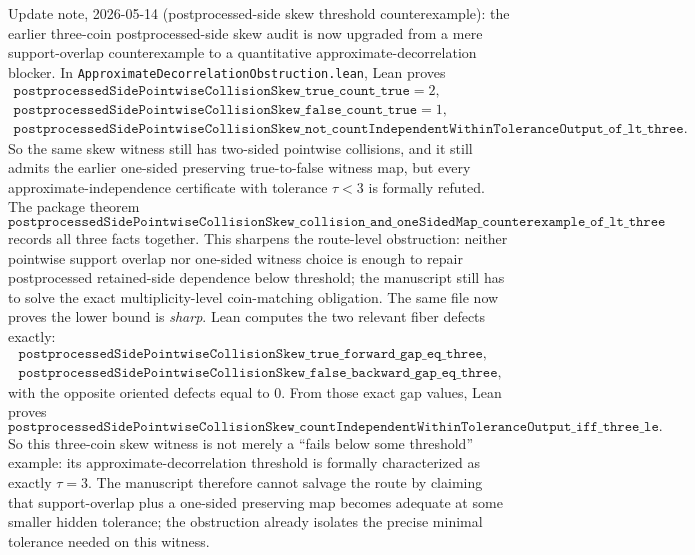 \documentclass[11pt]{article}
\theoremstyle{remark}
\begin{document}
Update note, 2026-05-14 (postprocessed-side skew threshold counterexample):
the earlier three-coin postprocessed-side skew audit is now upgraded from a
mere support-overlap counterexample to a quantitative approximate-decorrelation
blocker.  In \texttt{ApproximateDecorrelationObstruction.lean}, Lean proves
\[
\begin{gathered}
\texttt{postprocessedSidePointwiseCollisionSkew\_true\_count\_true}=2,\\
\texttt{postprocessedSidePointwiseCollisionSkew\_false\_count\_true}=1,\\
\texttt{postprocessedSidePointwiseCollisionSkew\_not\_countIndependentWithinToleranceOutput\_of\_lt\_three}.
\end{gathered}
\]
So the same skew witness still has two-sided pointwise collisions, and it still
admits the earlier one-sided preserving true-to-false witness map, but every
approximate-independence certificate with tolerance \(\tau<3\) is formally
refuted.  The package theorem
\[
\texttt{postprocessedSidePointwiseCollisionSkew\_collision\_and\_oneSidedMap\_counterexample\_of\_lt\_three}
\]
records all three facts together.  This sharpens the route-level obstruction:
neither pointwise support overlap nor one-sided witness choice is enough to
repair postprocessed retained-side dependence below threshold; the manuscript
still has to solve the exact multiplicity-level coin-matching obligation.
The same file now proves the lower bound is \emph{sharp}.  Lean computes the
two relevant fiber defects exactly:
\[
\begin{gathered}
\texttt{postprocessedSidePointwiseCollisionSkew\_true\_forward\_gap\_eq\_three},\\
\texttt{postprocessedSidePointwiseCollisionSkew\_false\_backward\_gap\_eq\_three},
\end{gathered}
\]
with the opposite oriented defects equal to \(0\).  From those exact gap
values, Lean proves
\[
\texttt{postprocessedSidePointwiseCollisionSkew\_countIndependentWithinToleranceOutput\_iff\_three\_le}.
\]
So this three-coin skew witness is not merely a ``fails below some threshold''
example: its approximate-decorrelation threshold is formally characterized as
exactly \(\tau = 3\).  The manuscript therefore cannot salvage the route by
claiming that support-overlap plus a one-sided preserving map becomes adequate
at some smaller hidden tolerance; the obstruction already isolates the precise
minimal tolerance needed on this witness.
\end{document}
